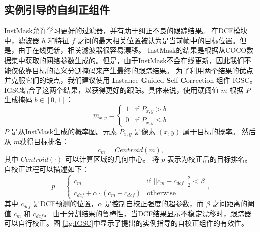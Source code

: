 \subsection{实例引导的自纠正组件} \label{sec:cog}
InstMask允许学习更好的过滤器，并有助于纠正不良的跟踪结果。
在DCF模块中，滤波器 $h$ 和特征 $f$ 之间的最大相关位置被认为是当前帧中的目标位置。但是，由于在线更新，相关滤波器很容易漂移。
InstMask的结果是根据从COCO数据集中获取的网络参数生成的。但是，由于InstMask不会在线更新，因此我们不能仅依靠目标的语义分割掩码来产生最终的跟踪结果。
为了利用两个结果的优点并克服它们的缺点，我们建议使用 \textbf{I}nstance \textbf{G}uided \textbf{S}elf-\textbf{C}orrection 组件 IGSC。IGSC结合了这两个结果，以获得更好的跟踪。具体来说，使用硬阈值 $m$ 根据 $P$ 生成掩码 $b \in [0, 1] $：
\begin{equation}
m_{x,y} = \left\{ \begin{array}{ll}
 1 & \textrm{if $P_{x,y} > b$}\\
 0 & \textrm{if $P_{x,y} \le b$}
 \end{array} \right.
\end{equation}
$P$ 是从InstMask生成的概率图。元素 $P_{x,y}$ 是像素 $(x,y)$ 属于目标的概率。
然后从 $m$获得目标排名：
\begin{equation}
c_{m} = Centroid(m),
\end{equation}
其中 $Centroid(\mathord{\cdot})$ 可以计算区域的几何中心。
将 $p$ 表示为校正后的目标排名。
自校正过程可以描述如下：
\begin{equation}
p = \left\{ \begin{array}{ll}
 c_{m} & \textrm{if $||c_{m}-c_{dcf}||_2^2 < \beta$}\\
 c_{dcf} + \alpha \cdot (c_{m}-c_{dcf}) & \textrm{otherwise}
 \end{array} \right.,
\end{equation}
其中 $c_{dcf}$ 是DCF预测的位置，$\alpha$ 是控制自校正强度的超参数，而 $\beta$ 之间距离的阈值 $c_{m}$ 和 $c_{dcf}$。
由于分割结果的鲁棒性，当DCF结果显示不稳定漂移时，跟踪器可以自行校正。图 \ref{fig:IGSC}中显示了提出的实例指导的自校正组件的有效性。

